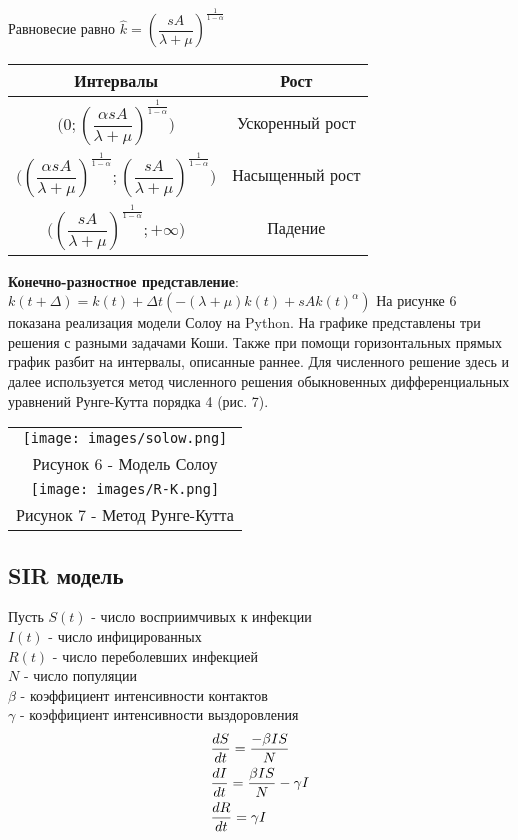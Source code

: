 Равновесие равно $\hat{k}=(\dfrac{sA}{\lambda+\mu})^{\frac{1}{1-\alpha}}$
\begin{center}
\begin{tabular}{|c|c|}
  \hline
  Интервалы&Рост\\
  \hline
  $\bigg(0;(\dfrac{\alpha sA}{\lambda+\mu})^{\frac{1}{1-\alpha}}\bigg)$&Ускоренный рост\\
  \hline
  $\bigg((\dfrac{\alpha sA}{\lambda+\mu})^{\frac{1}{1-\alpha}};(\dfrac{sA}{\lambda+\mu})^{\frac{1}{1-\alpha}}\bigg)$&Насыщенный рост\\
  \hline
  $\bigg((\dfrac{sA}{\lambda+\mu})^{\frac{1}{1-\alpha}};+\infty\bigg)$&Падение\\
  \hline
\end{tabular}
\end{center}
\textbf{Конечно-разностное представление}:
$k(t+\Delta)=k(t)+\Delta t(-(\lambda+\mu)k(t)+sAk(t)^{\alpha})$
На рисунке 6 показана реализация модели Солоу на Python. На графике представлены три решения с разными задачами Коши. Также при помощи горизонтальных прямых график разбит на интервалы, описанные раннее.
Для численного решение здесь и далее используется метод численного решения обыкновенных дифференциальных уравнений Рунге-Кутта порядка 4 (рис. 7).
\begin{center}
  \begin{tabular}{c}
    \texttt{[image: images/solow.png]}\\
    Рисунок 6 - Модель Солоу\\
    \texttt{[image: images/R-K.png]}\\
    Рисунок 7 - Метод Рунге-Кутта
  \end{tabular}
\end{center}


\subsection{SIR модель}
\noindent Пусть $S(t)$ - число восприимчивых к инфекции\\
$I(t)$ - число инфицированных\\
$R(t)$ - число переболевших инфекцией\\
$N$ - число популяции\\
$\beta$ - коэффициент интенсивности контактов \\
$\gamma$ - коэффициент интенсивности выздоровления
\begin{align}
  &\dfrac{d S}{dt}=\dfrac{-\beta IS}{N}\notag\\
  &\dfrac{d I}{dt}=\dfrac{\beta IS}{N}-\gamma I\\
  &\dfrac{d R}{dt}=\gamma I\notag
\end{align}

